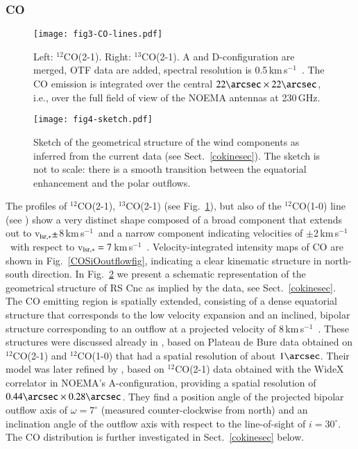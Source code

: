 \documentclass{aa}
\newcommand{\kms}{\,km\,s$^{-1}$~}
\begin{document}
\subsubsection{CO}\label{cosec}

\begin{figure}[h]
    \centering
    \vspace{-3.0cm}
    \texttt{[image: fig3-CO-lines.pdf]}
    \caption{Left:  $^{12}$CO(2-1).
             Right: $^{13}$CO(2-1).
             A and D-configuration are merged, OTF data are added,
             spectral resolution is 0.5\kms. 
             The CO emission is integrated over the central 
             $22\arcsec \times 22\arcsec$, 
             i.e., over the full field of view of the NOEMA antennas at 
             230\,GHz.} 
    \label{codetecfig}
\end{figure}

\begin{figure}[h]
    \centering
    \texttt{[image: fig4-sketch.pdf]}
    \caption{Sketch of the geometrical structure of the wind components
        as inferred from the current data (see Sect.~\ref{cokinesec}).
        The sketch is not to scale: there is a smooth transition between the
        equatorial enhancement and the polar outflows.}
    \label{geomsketch}
\end{figure}

The profiles of $^{12}$CO(2-1), $^{13}$CO(2-1) (see
Fig.~\ref{codetecfig}), but also of the $^{12}$CO(1-0) line (see
\citet{lwlgm2010}) show a very distinct shape composed of a broad
component that extends out to v$_{\rm lsr,*}\pm$8\kms and a narrow
component indicating velocities of $\pm$2\kms with respect to v$_{\rm
lsr,*}=7$\kms. Velocity-integrated intensity maps of CO are shown
in Fig.~\ref{COSiOoutflowfig}, indicating a clear kinematic structure
in north-south direction.  In Fig.~\ref{geomsketch} we present a
schematic representation  of the geometrical structure of RS Cnc as
implied by the data, see  Sect.~\ref{cokinesec}. The CO emitting
region is spatially extended, consisting of a dense equatorial
structure that corresponds to the low velocity expansion and an
inclined, bipolar structure corresponding to an outflow at a
projected velocity of 8\kms. These structures were discussed already
in \citet{hmwng14}, based on Plateau de Bure data obtained on
$^{12}$CO(2-1) and $^{12}$CO(1-0) that had a spatial resolution of
about $1\arcsec$. Their model was later refined by \citet{nht2018},
based on $^{12}$CO(2-1) data obtained with the WideX correlator in
NOEMA's A-configuration, providing a spatial  resolution of
$0.44\arcsec\times0.28\arcsec$. They find a position angle of the
projected bipolar outflow axis of $\omega = 7^{\circ}$ (measured
counter-clockwise from north) and an inclination angle of the outflow
axis with respect to the line-of-sight of $i = 30^{\circ}$. The CO
distribution is further investigated in Sect.~\ref{cokinesec} below.
\end{document}

